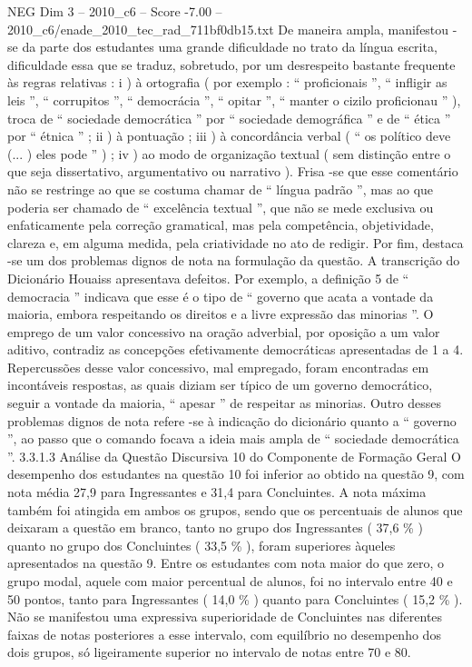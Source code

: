 \begin{textsample}{NEG Dim 3 – 2010\_c6 – Score -7.00 – 2010\_c6/enade\_2010\_tec\_rad\_711bf0db15.txt}
De maneira ampla, manifestou -se da parte dos estudantes uma grande dificuldade no trato da língua escrita, dificuldade essa que se traduz, sobretudo, por um desrespeito bastante frequente às regras relativas : i ) à ortografia ( por exemplo : “ proficionais ”, “ infligir as leis ”, “ corrupitos ”, “ democrácia ”, “ opitar ”, “ manter o cizilo proficionau ” ), troca de “ sociedade democrática ” por “ sociedade demográfica ” e de “ ética ” por “ étnica ” ; ii ) à pontuação ; iii ) à concordância verbal ( “ os político deve (... ) eles pode ” ) ; iv ) ao modo de organização textual ( sem distinção entre o que seja dissertativo, argumentativo ou narrativo ).
Frisa -se que esse comentário não se restringe ao que se costuma chamar de “ língua padrão ”, mas ao que poderia ser chamado de “ excelência textual ”, que não se mede exclusiva ou enfaticamente pela correção gramatical, mas pela competência, objetividade, clareza e, em alguma medida, pela criatividade no ato de redigir.
Por fim, destaca -se um dos problemas dignos de nota na formulação da questão.
A transcrição do Dicionário Houaiss apresentava defeitos.
Por exemplo, a definição 5 de “ democracia ” indicava que esse é o tipo de “ governo que acata a vontade da maioria, embora respeitando os direitos e a livre expressão das minorias ”.
O emprego de um valor concessivo na oração adverbial, por oposição a um valor aditivo, contradiz as concepções efetivamente democráticas apresentadas de 1 a 4.
Repercussões desse valor concessivo, mal empregado, foram encontradas em incontáveis respostas, as quais diziam ser típico de um governo democrático, seguir a vontade da maioria, “ apesar ” de respeitar as minorias.
Outro desses problemas dignos de nota refere -se à indicação do dicionário quanto a “ governo ”, ao passo que o comando focava a ideia mais ampla de “ sociedade democrática ”. 3.3.1.3 Análise da Questão Discursiva 10 do Componente de Formação Geral O desempenho dos estudantes na questão 10 foi inferior ao obtido na questão 9, com nota média 27,9 para Ingressantes e 31,4 para Concluintes.
A nota máxima também foi atingida em ambos os grupos, sendo que os percentuais de alunos que deixaram a questão em branco, tanto no grupo dos Ingressantes ( 37,6 \% ) quanto no grupo dos Concluintes ( 33,5 \% ), foram superiores àqueles apresentados na questão 9.
Entre os estudantes com nota maior do que zero, o grupo modal, aquele com maior percentual de alunos, foi no intervalo entre 40 e 50 pontos, tanto para Ingressantes ( 14,0 \% ) quanto para Concluintes ( 15,2 \% ).
Não se manifestou uma expressiva superioridade de Concluintes nas diferentes faixas de notas posteriores a esse intervalo, com equilíbrio no desempenho dos dois grupos, só ligeiramente superior no intervalo de notas entre 70 e 80.

\end{textsample}
